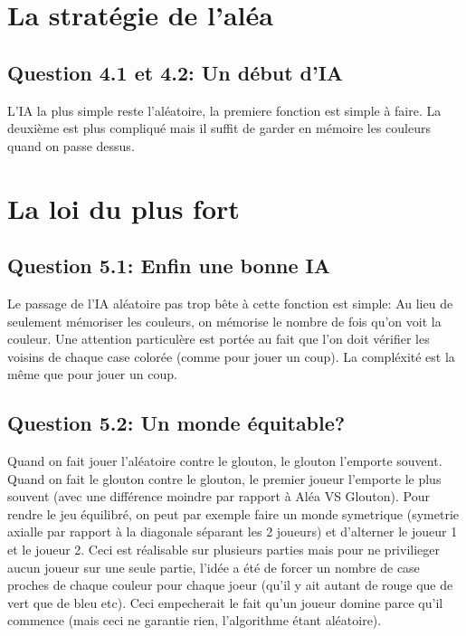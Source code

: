 \documentclass{article}
\begin{document}
    \section{La stratégie de l'aléa}

    \subsection*{Question 4.1 et 4.2: Un début d'IA}

    L'IA la plus simple reste l'aléatoire, la premiere fonction est simple à faire. La deuxième est plus compliqué mais il suffit de garder en mémoire les couleurs quand on passe dessus.

    \section{La loi du plus fort}

    \subsection*{Question 5.1: Enfin une bonne IA}

    Le passage de l'IA aléatoire pas trop bête à cette fonction est simple: Au lieu de seulement mémoriser les couleurs, on mémorise le nombre de fois qu'on voit la couleur. Une attention particulère est portée au fait que l'on doit vérifier les voisins de chaque case colorée (comme pour jouer un coup). La compléxité est la même que pour jouer un coup.

    \subsection*{Question 5.2: Un monde équitable?}

    Quand on fait jouer l'aléatoire contre le glouton, le glouton l'emporte souvent. Quand on fait le glouton contre le glouton, le premier joueur l'emporte le plus souvent (avec une différence moindre par rapport à Aléa VS Glouton). Pour rendre le jeu équilibré, on peut par exemple faire un monde symetrique (symetrie axialle par rapport à la diagonale séparant les 2 joueurs) et d'alterner le joueur 1 et le joueur 2. Ceci est réalisable sur plusieurs parties mais pour ne privilieger aucun joueur sur une seule partie, l'idée a été de forcer un nombre de case proches de chaque couleur pour chaque joeur (qu'il y ait autant de rouge que de vert que de bleu etc). Ceci empecherait le fait qu'un joueur domine parce qu'il commence (mais ceci ne garantie rien, l'algorithme étant aléatoire).
\end{document}
